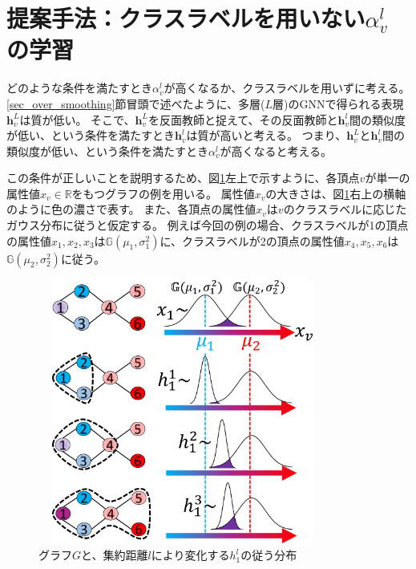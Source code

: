 \documentclass[a4j,twocolumn]{jsarticle}
\begin{document}
\section{提案手法：クラスラベルを用いない$\alpha_v^l$の学習}
\label{sec_proposal}
\vspace{-2mm}

どのような条件を満たすとき$\alpha_v^l$が高くなるか、クラスラベルを用いずに考える。
\ref{sec_over_smoothing}節冒頭で述べたように、多層($L$層)のGNNで得られる表現$\bm{h}_v^L$は質が低い。
そこで、$\bm{h}_v^L$を反面教師と捉えて、その反面教師と$\bm{h}_v^l$間の類似度が低い、という条件を満たすとき$\bm{h}_v^l$は質が高いと考える。
つまり、$\bm{h}_v^L$と$\bm{h}_v^l$間の類似度が低い、という条件を満たすとき$\alpha_v^l$が高くなると考える。

この条件が正しいことを説明するため、図\ref{fig_example2}左上で示すように、各頂点$v$が単一の属性値$x_v\in \mathbb{R}$をもつグラフの例を用いる。
属性値$x_v$の大きさは、図\ref{fig_example2}右上の横軸のように色の濃さで表す。
また、各頂点の属性値$x_v$は$v$のクラスラベルに応じたガウス分布に従うと仮定する。
例えば今回の例の場合、クラスラベルが1の頂点の属性値$x_1,x_2,x_3$は$\mathbb{G}(\mu_1, \sigma_1^2)$に、クラスラベルが2の頂点の属性値$x_4,x_5,x_6$は$\mathbb{G}(\mu_2, \sigma_2^2)$に従う。
\vspace{-2mm}

\begin{figure}[!h]
  \centering
  \includegraphics[height=8.7cm,width=9.5cm]{example2.pdf}
  \vspace{-7mm}
  \caption{グラフ$G$と、集約距離$l$により変化する$h_1^l$の従う分布}
  \label{fig_example2}
\end{figure}
\end{document}
